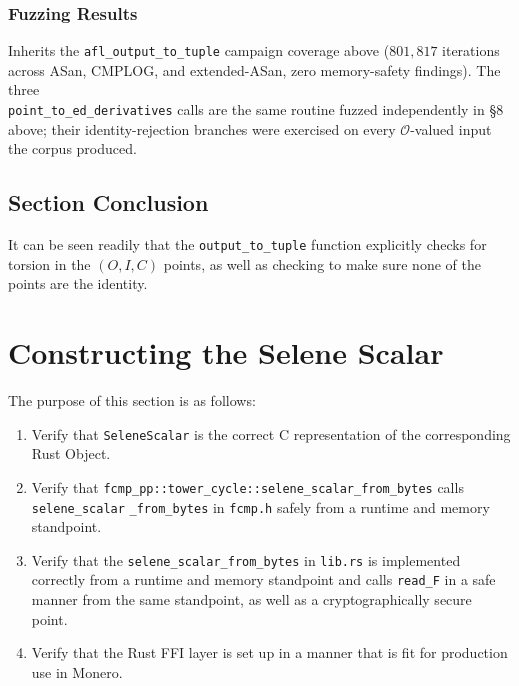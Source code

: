 \documentclass[12pt,titlepage,table]{article}
\begin{document}
\subsubsection{Fuzzing Results}
Inherits the \verb+afl_output_to_tuple+ campaign coverage above ($801{,}817$ iterations across ASan, CMPLOG, and extended-ASan, zero memory-safety findings).  The three \\\verb+point_to_ed_derivatives+ calls are the same routine fuzzed independently in \S 8 above; their identity-rejection branches were exercised on every $\mathcal{O}$-valued input the corpus produced.


\subsection[Section Conclusion]{Section Conclusion \hfill \checkmark}
It can be seen readily that the \verb+output_to_tuple+ function explicitly checks for torsion in the $(O,I,C)$ points, as well as checking to make sure none of the points are the identity. 

\newpage
\section{Constructing the Selene Scalar}
The purpose of this section is as follows:
\begin{enumerate}
\item Verify that \verb+SeleneScalar+ is the correct C representation of the corresponding Rust Object.
\item Verify that \verb+fcmp_pp::tower_cycle::selene_scalar_from_bytes+ calls \verb+selene_scalar+ \verb+_from_bytes+ in  \verb+fcmp.h+ safely from a runtime and memory standpoint.
\item Verify that the \verb+selene_scalar_from_bytes+ in \verb+lib.rs+ is implemented correctly from a runtime and memory standpoint and calls \verb+read_F+ in a safe manner from the same standpoint, as well as a cryptographically secure point.
\item Verify that the Rust FFI layer is set up in a manner that is fit for production use in Monero.
\end{enumerate}
\end{document}
